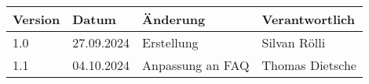 \begin{tabularx}{\textwidth}{l l X l}
        \textbf{Version} & \textbf{Datum} & \textbf{Änderung} & \textbf{Verantwortlich} \\ \hline
        1.0 & 27.09.2024 & Erstellung & Silvan Rölli \\ \hline
        1.1 & 04.10.2024 & Anpassung an FAQ & Thomas Dietsche \\ \hline
\end{tabularx}

